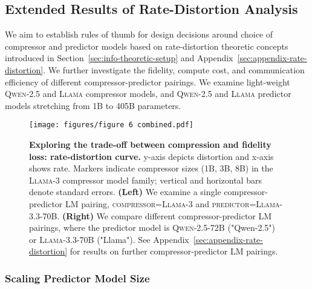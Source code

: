 \documentclass{article} %
\begin{document}
\subsection{Extended Results of Rate-Distortion Analysis}
\label{sec:appendix-rate-distortion-results}
We aim to establish rules of thumb for design decisions around choice of compressor and predictor models based on rate-distortion theoretic concepts introduced in Section~\ref{sec:info-theoretic-setup} and Appendix~\ref{sec:appendix-rate-distortion}. 
We further investigate the fidelity, compute cost, and communication efficiency of different compressor-predictor pairings. 
We examine light-weight \textsc{Qwen-2.5} and \textsc{Llama} compressor models, and \textsc{Qwen-2.5} and \textsc{Llama} predictor models stretching from 1B to 405B parameters. 

\begin{figure}[h]
    \centering
    \texttt{[image: figures/figure 6 combined.pdf]}
    \caption{\textbf{Exploring the trade-off between compression and fidelity loss: rate-distortion curve.} y-axis depicts distortion and x-axis shows rate.
    Markers indicate compressor sizes (1B, 3B, 8B) in the \textsc{Llama-3} compressor model family; vertical and horizontal bars denote standard errors. 
    \textbf{(Left)} We examine a single compressor-predictor LM pairing, \textsc{compressor=Llama-3} and \textsc{predictor=Llama-3.3-70B}. 
    \textbf{(Right)} We compare different compressor-predictor LM pairings, where the predictor model is \textsc{Qwen-2.5-72B} ("Qwen-2.5") or \textsc{Llama-3.3-70B} ("Llama"). See Appendix~\ref{sec:appendix-rate-distortion} for results on further compressor-predictor LM pairings.}
    \label{fig:figure-6/7-combined}
\end{figure}

\subsubsection{Scaling Predictor Model Size} 
\label{sec:appendix-scaling-predictor-size}
\end{document}
